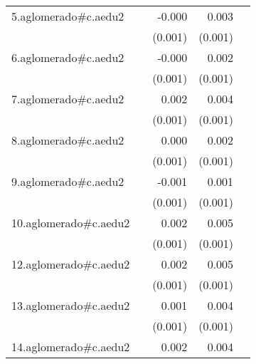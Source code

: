 {\begin{longtable}{l*{4}{D{.}{.}{-1}}}
\addlinespace
5.aglomerado#c.aedu2&                     &      -0.000         &       0.003\sym{**} &                     \\
            &                     &     (0.001)         &     (0.001)         &                     \\
\addlinespace
6.aglomerado#c.aedu2&                     &      -0.000         &       0.002\sym{**} &                     \\
            &                     &     (0.001)         &     (0.001)         &                     \\
\addlinespace
7.aglomerado#c.aedu2&                     &       0.002         &       0.004\sym{***}&                     \\
            &                     &     (0.001)         &     (0.001)         &                     \\
\addlinespace
8.aglomerado#c.aedu2&                     &       0.000         &       0.002\sym{*}  &                     \\
            &                     &     (0.001)         &     (0.001)         &                     \\
\addlinespace
9.aglomerado#c.aedu2&                     &      -0.001         &       0.001         &                     \\
            &                     &     (0.001)         &     (0.001)         &                     \\
\addlinespace
10.aglomerado#c.aedu2&                     &       0.002         &       0.005\sym{***}&                     \\
            &                     &     (0.001)         &     (0.001)         &                     \\
\addlinespace
12.aglomerado#c.aedu2&                     &       0.002         &       0.005\sym{***}&                     \\
            &                     &     (0.001)         &     (0.001)         &                     \\
\addlinespace
13.aglomerado#c.aedu2&                     &       0.001         &       0.004\sym{***}&                     \\
            &                     &     (0.001)         &     (0.001)         &                     \\
\addlinespace
14.aglomerado#c.aedu2&                     &       0.002         &       0.004\sym{***}&                     \\

\end{longtable}}
